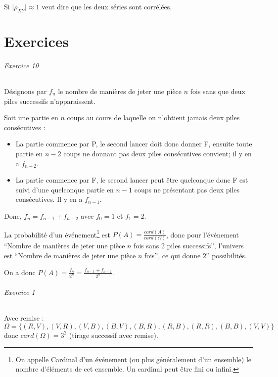 \documentclass[10pt,a4paper,french]{article}
\begin{document}
Si $\vert \rho_{X Y} \vert \approx 1$ veut dire que les deux séries sont corrélées.










\part{Exercices}

\paragraph{Exercice 10}
Désignons par $f_n$ le nombre de manières de jeter une pièce $n$ fois sans que deux piles successifs n'apparaissent.

Soit une partie en $n$ coups au cours de laquelle on n'obtient jamais deux piles consécutives :
\begin{itemize}
\item La partie commence par P, le second lancer doit donc donner F, ensuite toute partie en $n-2$ coups ne donnant pas deux piles consécutives convient; il y en a $f_{n-2}$.
\item La partie commence par F, le second lancer peut être quelconque donc F est suivi d'une quelconque partie en $n-1$ coups ne présentant pas deux piles consécutives. Il y en a $f_{n-1}$.
\end{itemize}

Donc, $f_n = f_{n-1} + f_{n-2}$ avec $f_0 = 1$ et $f_1=2$.

La probabilité d'un événement\footnote{On appelle Cardinal d'un événement (ou plus généralement d'un ensemble) le nombre d'éléments de cet ensemble. Un cardinal peut être fini ou infini.} est $P(A)=\frac{card(A)}{card(\Omega)}$, donc pour l'événement ``Nombre de manières de jeter une pièce $n$ fois sans 2 piles successifs'', l'univers est ``Nombre de manières de jeter une pièce $n$ fois'', ce qui donne $2^n$ possibilités.

On a donc $P(A)=\frac{f_n}{2^n}=\frac{f_{n-1}+f_{n-2}}{2^n}$.

\paragraph{Exercice 1}
Avec remise : $\Omega=\lbrace(R, V), (V, R), (V, B), (B, V), (B, R), (R, B), (R, R), (B, B), (V, V)\rbrace$ donc $card(\Omega)=3^2$ (tirage successif avec remise).
\end{document}
